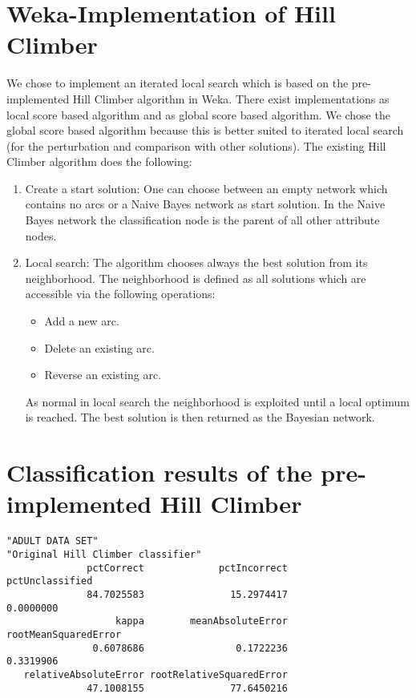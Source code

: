 \documentclass[paper=a4, fontsize=11pt]{scrartcl} %
\numberwithin{equation}{section} %
\numberwithin{figure}{section} %
\numberwithin{table}{section} %
\begin{document}
%
%
%
\section{Weka-Implementation of Hill Climber}

We chose to implement an iterated local search which is based on the pre-implemented Hill Climber algorithm in Weka. There exist implementations as local score based algorithm and as global score based algorithm.  We chose the global score based algorithm because this is better suited to iterated local search (for the perturbation and comparison with other solutions). The existing Hill Climber algorithm does the following:

\begin{enumerate}
	\item Create a start solution: One can choose between an empty network which contains no arcs or a Naive Bayes network as start solution. In the Naive Bayes network the classification node is the parent of all other attribute nodes.
	\item Local search: The algorithm chooses always the best solution from its neighborhood. The neighborhood is defined as all solutions which are accessible via the following operations:
		\begin{itemize}
			\item Add a new arc.
			\item Delete an existing arc.
			\item Reverse an existing arc.
		\end{itemize}
		As normal in local search the neighborhood is exploited until a local optimum is reached. The best solution is then returned as the Bayesian network.
\end{enumerate}

\newpage

\section{Classification results of the pre-implemented Hill Climber}


\begin{lstlisting}[caption={Classification result with default Hill Climber},label=listingDefault]
"ADULT DATA SET"
"Original Hill Climber classifier"
              pctCorrect             pctIncorrect          pctUnclassified 
              84.7025583               15.2974417                0.0000000 
                   kappa        meanAbsoluteError     rootMeanSquaredError 
               0.6078686                0.1722236                0.3319906 
   relativeAbsoluteError rootRelativeSquaredError 
              47.1008155               77.6450216 
\end{lstlisting}
\end{document}
